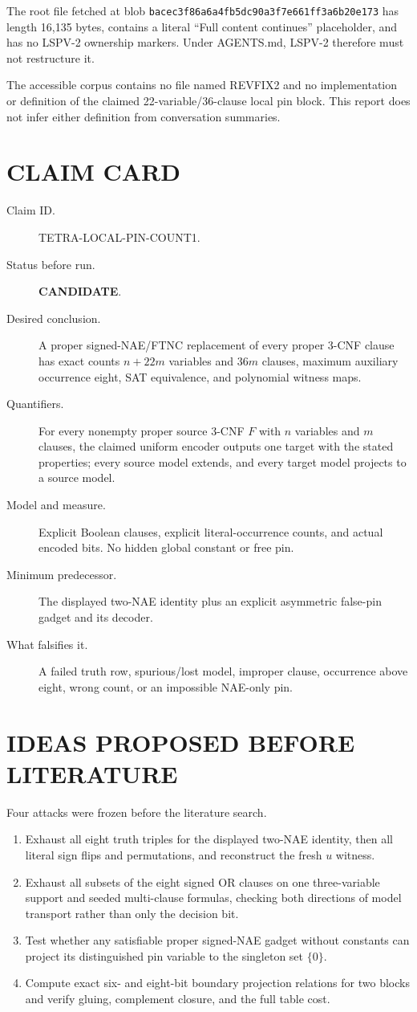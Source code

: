 \documentclass[11pt]{article}
\newcommand{\CAND}{\textbf{CANDIDATE}}
\begin{document}
The root file fetched at blob
\texttt{bacec3f86a6a4fb5dc90a3f7e661ff3a6b20e173} has length 16,135 bytes,
contains a literal ``Full content continues'' placeholder, and has no LSPV-2
ownership markers.  Under AGENTS.md, LSPV-2 therefore must not restructure it.

The accessible corpus contains no file named REVFIX2 and no implementation or
definition of the claimed 22-variable/36-clause local pin block.  This report
does not infer either definition from conversation summaries.

\section{CLAIM CARD}
\begin{description}
\item[Claim ID.] TETRA-LOCAL-PIN-COUNT1.
\item[Status before run.] \CAND.
\item[Desired conclusion.] A proper signed-NAE/FTNC replacement of every proper
3-CNF clause has exact counts $n+22m$ variables and $36m$ clauses, maximum
auxiliary occurrence eight, SAT equivalence, and polynomial witness maps.
\item[Quantifiers.] For every nonempty proper source 3-CNF $F$ with $n$
variables and $m$ clauses, the claimed uniform encoder outputs one target with
the stated properties; every source model extends, and every target model
projects to a source model.
\item[Model and measure.] Explicit Boolean clauses, explicit literal-occurrence
counts, and actual encoded bits.  No hidden global constant or free pin.
\item[Minimum predecessor.] The displayed two-NAE identity plus an explicit
asymmetric false-pin gadget and its decoder.
\item[What falsifies it.] A failed truth row, spurious/lost model, improper
clause, occurrence above eight, wrong count, or an impossible NAE-only pin.
\end{description}

\section{IDEAS PROPOSED BEFORE LITERATURE}
Four attacks were frozen before the literature search.
\begin{enumerate}
\item Exhaust all eight truth triples for the displayed two-NAE identity, then
all literal sign flips and permutations, and reconstruct the fresh $u$ witness.
\item Exhaust all subsets of the eight signed OR clauses on one three-variable
support and seeded multi-clause formulas, checking both directions of model
transport rather than only the decision bit.
\item Test whether any satisfiable proper signed-NAE gadget without constants can
project its distinguished pin variable to the singleton set $\{0\}$.
\item Compute exact six- and eight-bit boundary projection relations for two
blocks and verify gluing, complement closure, and the full table cost.
\end{enumerate}
\end{document}
